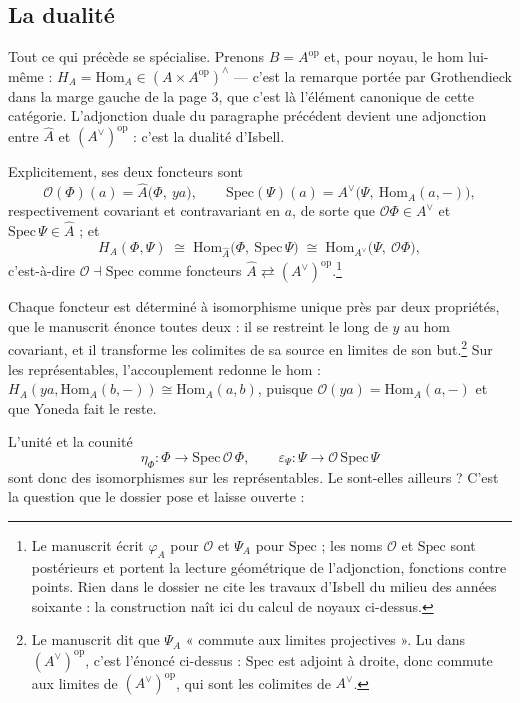 \documentclass[11pt,a4paper]{article}
\begin{document}
\subsection*{La dualité}

Tout ce qui précède se spécialise. Prenons $B = A^{\mathrm{op}}$ et, pour
noyau, le hom lui-même : $H_{A} = \mathrm{Hom}_{A} \in (A \times
A^{\mathrm{op}})^{\wedge}$ — c'est la remarque portée par Grothendieck dans la
marge gauche de la page 3, que c'est là l'élément canonique de cette
catégorie. L'adjonction duale du paragraphe précédent devient une adjonction
entre $\widehat{A}$ et $(A^{\vee})^{\mathrm{op}}$ : c'est la dualité d'Isbell.

Explicitement, ses deux foncteurs sont
\[
\mathcal{O}(\Phi)(a) = \widehat{A}\bigl(\Phi,\ y a\bigr), \qquad
\mathrm{Spec}(\Psi)(a) = A^{\vee}\bigl(\Psi,\ \mathrm{Hom}_{A}(a,-)\bigr),
\]
respectivement covariant et contravariant en $a$, de sorte que
$\mathcal{O}\Phi \in A^{\vee}$ et $\mathrm{Spec}\,\Psi \in \widehat{A}$ ; et
\[
H_{A}(\Phi, \Psi)
\;\cong\; \mathrm{Hom}_{\widehat{A}}\bigl(\Phi,\ \mathrm{Spec}\,\Psi\bigr)
\;\cong\; \mathrm{Hom}_{A^{\vee}}\bigl(\Psi,\ \mathcal{O}\Phi\bigr),
\]
c'est-à-dire $\mathcal{O} \dashv \mathrm{Spec}$ comme foncteurs $\widehat{A}
\rightleftarrows (A^{\vee})^{\mathrm{op}}$.\footnote{Le manuscrit écrit
$\varphi_{A}$ pour $\mathcal{O}$ et $\Psi_{A}$ pour $\mathrm{Spec}$ ; les noms
$\mathcal{O}$ et $\mathrm{Spec}$ sont postérieurs et portent la lecture
géométrique de l'adjonction, fonctions contre points. Rien dans le dossier ne
cite les travaux d'Isbell du milieu des années soixante : la construction naît
ici du calcul de noyaux ci-dessus.}

Chaque foncteur est déterminé à isomorphisme unique près par deux propriétés,
que le manuscrit énonce toutes deux : il se restreint le long de $y$ au hom
covariant, et il transforme les colimites de sa source en limites de son
but.\footnote{Le manuscrit dit que $\Psi_{A}$ « commute aux limites
projectives ». Lu dans $(A^{\vee})^{\mathrm{op}}$, c'est l'énoncé ci-dessus :
$\mathrm{Spec}$ est adjoint à droite, donc commute aux limites de
$(A^{\vee})^{\mathrm{op}}$, qui sont les colimites de $A^{\vee}$.} Sur les
représentables, l'accouplement redonne le hom :
$H_{A}(y a, \mathrm{Hom}_{A}(b,-)) \cong \mathrm{Hom}_{A}(a,b)$, puisque
$\mathcal{O}(y a) = \mathrm{Hom}_{A}(a,-)$ et que Yoneda fait le reste.

L'unité et la counité
\[
\eta_{\Phi} : \Phi \longrightarrow \mathrm{Spec}\,\mathcal{O}\,\Phi,
\qquad
\varepsilon_{\Psi} : \Psi \longrightarrow \mathcal{O}\,\mathrm{Spec}\,\Psi
\]
sont donc des isomorphismes sur les représentables. Le sont-elles ailleurs ?
C'est la question que le dossier pose et laisse ouverte :
\end{document}
